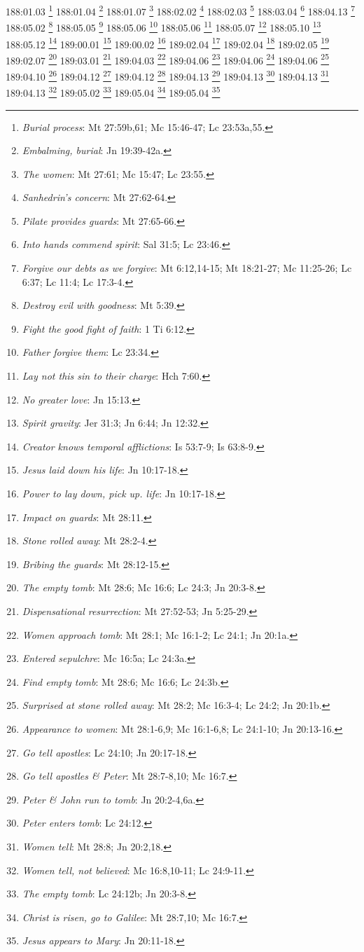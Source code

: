 {{{{{{{{{{{{{{{{{{{{{{{{{{{{{{{{{{{{{{{{{{{{{{{{{{{{{{{{{{{{{{{{{{{{{{{{{{{{{{{{{{{{{{{{{{{{{{{188:01.03 \footnote{\textit{Burial process}: Mt 27:59b,61; Mc 15:46-47; Lc 23:53a,55.}
188:01.04 \footnote{\textit{Embalming, burial}: Jn 19:39-42a.}
188:01.07 \footnote{\textit{The women}: Mt 27:61; Mc 15:47; Lc 23:55.}
188:02.02 \footnote{\textit{Sanhedrin's concern}: Mt 27:62-64.}
188:02.03 \footnote{\textit{Pilate provides guards}: Mt 27:65-66.}
188:03.04 \footnote{\textit{Into hands commend spirit}: Sal 31:5; Lc 23:46.}
188:04.13 \footnote{\textit{Forgive our debts as we forgive}: Mt 6:12,14-15; Mt 18:21-27; Mc 11:25-26; Lc 6:37; Lc 11:4; Lc 17:3-4.}
188:05.02 \footnote{\textit{Destroy evil with goodness}: Mt 5:39.}
188:05.05 \footnote{\textit{Fight the good fight of faith}: 1 Ti 6:12.}
188:05.06 \footnote{\textit{Father forgive them}: Lc 23:34.}
188:05.06 \footnote{\textit{Lay not this sin to their charge}: Hch 7:60.}
188:05.07 \footnote{\textit{No greater love}: Jn 15:13.}
188:05.10 \footnote{\textit{Spirit gravity}: Jer 31:3; Jn 6:44; Jn 12:32.}
188:05.12 \footnote{\textit{Creator knows temporal afflictions}: Is 53:7-9; Is 63:8-9.}
189:00.01 \footnote{\textit{Jesus laid down his life}: Jn 10:17-18.}
189:00.02 \footnote{\textit{Power to lay down, pick up. life}: Jn 10:17-18.}
189:02.04 \footnote{\textit{Impact on guards}: Mt 28:11.}
189:02.04 \footnote{\textit{Stone rolled away}: Mt 28:2-4.}
189:02.05 \footnote{\textit{Bribing the guards}: Mt 28:12-15.}
189:02.07 \footnote{\textit{The empty tomb}: Mt 28:6; Mc 16:6; Lc 24:3; Jn 20:3-8.}
189:03.01 \footnote{\textit{Dispensational resurrection}: Mt 27:52-53; Jn 5:25-29.}
189:04.03 \footnote{\textit{Women approach tomb}: Mt 28:1; Mc 16:1-2; Lc 24:1; Jn 20:1a.}
189:04.06 \footnote{\textit{Entered sepulchre}: Mc 16:5a; Lc 24:3a.}
189:04.06 \footnote{\textit{Find empty tomb}: Mt 28:6; Mc 16:6; Lc 24:3b.}
189:04.06 \footnote{\textit{Surprised at stone rolled away}: Mt 28:2; Mc 16:3-4; Lc 24:2; Jn 20:1b.}
189:04.10 \footnote{\textit{Appearance to women}: Mt 28:1-6,9; Mc 16:1-6,8; Lc 24:1-10; Jn 20:13-16.}
189:04.12 \footnote{\textit{Go tell apostles}: Lc 24:10; Jn 20:17-18.}
189:04.12 \footnote{\textit{Go tell apostles & Peter}: Mt 28:7-8,10; Mc 16:7.}
189:04.13 \footnote{\textit{Peter & John run to tomb}: Jn 20:2-4,6a.}
189:04.13 \footnote{\textit{Peter enters tomb}: Lc 24:12.}
189:04.13 \footnote{\textit{Women tell}: Mt 28:8; Jn 20:2,18.}
189:04.13 \footnote{\textit{Women tell, not believed}: Mc 16:8,10-11; Lc 24:9-11.}
189:05.02 \footnote{\textit{The empty tomb}: Lc 24:12b; Jn 20:3-8.}
189:05.04 \footnote{\textit{Christ is risen, go to Galilee}: Mt 28:7,10; Mc 16:7.}
189:05.04 \footnote{\textit{Jesus appears to Mary}: Jn 20:11-18.}
}}}}}}}}}}}}}}}}}}}}}}}}}}}}}}}}}}}}}}}}}}}}}}}}}}}}}}}}}}}}}}}}}}}}}}}}}}}}}}}}}}}}}}}}}}}}}}}
